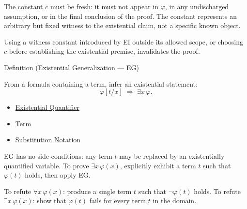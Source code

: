 \begin{remark*}
The constant $c$ must be fresh: it must not appear in $\varphi$, in any
undischarged assumption, or in the final conclusion of the proof. The constant
represents an arbitrary but fixed witness to the existential claim, not a
specific known object.
\end{remark*}

\begin{remark*}
Using a witness constant introduced by EI outside its allowed scope, or
choosing $c$ before establishing the existential premise, invalidates the proof.
\end{remark*}

\begin{definitionbox}{Definition (Existential Generalization — EG)}
\begin{definition}\label{def:eg}
From a formula containing a term, infer an existential statement:
\[
\varphi[t/x] \;\Rightarrow\; \exists x\,\varphi.
\]
\end{definition}
\end{definitionbox}

\begin{dependencies}
\begin{itemize}
  \item \hyperref[def:existential-q]{Existential Quantifier}
  \item \hyperref[def:term]{Term}
  \item \hyperref[def:subst-notation]{Substitution Notation}
\end{itemize}
\end{dependencies}

\begin{remark*}
EG has no side conditions: any term $t$ may be replaced by an existentially
quantified variable. To prove $\exists x\,\varphi(x)$, explicitly exhibit a
term $t$ such that $\varphi(t)$ holds, then apply EG.
\end{remark*}

\begin{remark*}
To refute $\forall x\,\varphi(x)$: produce a single term $t$ such that
$\neg\varphi(t)$ holds. To refute $\exists x\,\varphi(x)$: show that $\varphi(t)$
fails for every term $t$ in the domain.
\end{remark*}
